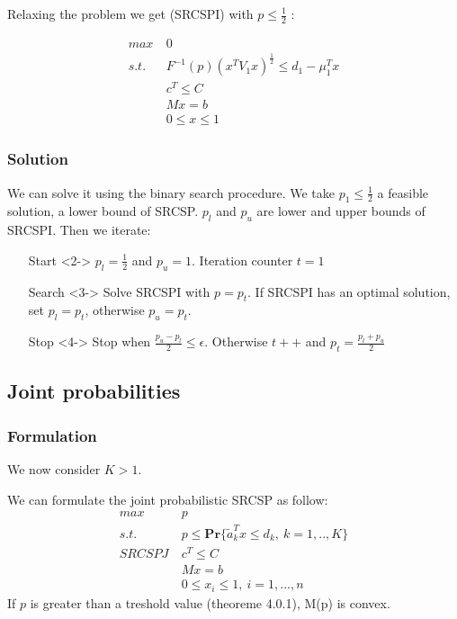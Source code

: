 \documentclass{beamer}
\begin{document}
\begin{frame}
Relaxing the problem we get (SRCSPI) with $p \leq \frac{1}{2}$ :

\begin{align*}
 max\ & 0\\
 s.t.\ & F^{-1}(p)(x^TV_1x)^{\frac{1}{2}} \leq d_1 - \mu_1^Tx \\
 & c^T \leq C \\
 & Mx = b \\
 & 0 \leq x \leq 1
\end{align*}
\end{frame}

\subsubsection{Solution}
\begin{frame}
We can solve it using the binary search procedure. We take $p_1 \leq \frac{1}{2}$ a feasible solution, a lower bound of SRCSP. $p_l$ and $p_u$ are lower and upper bounds of SRCSPI. Then we iterate:

\begin{itemize}
\item[Start]<2-> $p_l = \frac{1}{2}$ and $p_u = 1$. Iteration counter $t = 1$
\item[Search]<3-> Solve SRCSPI with $p = p_t$. If SRCSPI has an optimal solution, set $p_l = p_t$, otherwise $p_u = p_t$.
\item[Stop]<4-> Stop when $\frac{p_u - p_l}{2} \leq \epsilon$. Otherwise $t++$ and $p_t = \frac{p_l + p_u}{2} $
\end{itemize}

\end{frame}

\subsection{Joint probabilities}

\subsubsection{Formulation}
\begin{frame}
	We now consider $K > 1$.
	
	We can formulate the joint probabilistic SRCSP as follow:
\begin{align*}
 max\ & p\\
 s.t.\ & p \leq \mathbf{Pr} \{ \tilde{a}_k^Tx \leq d_k ,\ k=1,..,K \} \\
 SRCSPJ \ & c^T \leq C \\
 & Mx = b \\
 & 0 \leq x_i \leq 1, \ i = 1, ..., n
\end{align*}
\pause
If $p$ is greater than a treshold value (theoreme 4.0.1), M(p) is convex.
\end{frame}
\end{document}
